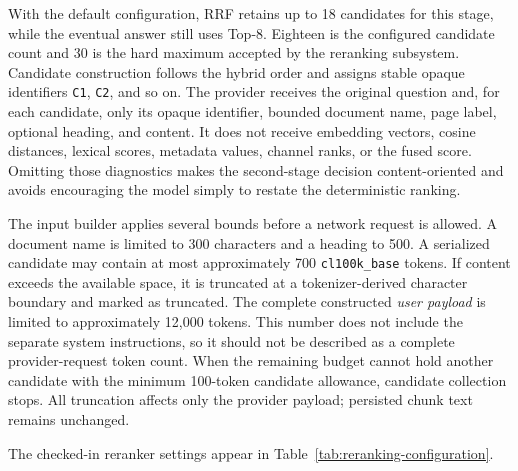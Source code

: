 With the default configuration, RRF retains up to 18 candidates for this stage, while the eventual answer still uses Top-8. Eighteen is the configured candidate count and 30 is the hard maximum accepted by the reranking subsystem. Candidate construction follows the hybrid order and assigns stable opaque identifiers \texttt{C1}, \texttt{C2}, and so on. The provider receives the original question and, for each candidate, only its opaque identifier, bounded document name, page label, optional heading, and content. It does not receive embedding vectors, cosine distances, lexical scores, metadata values, channel ranks, or the fused score. Omitting those diagnostics makes the second-stage decision content-oriented and avoids encouraging the model simply to restate the deterministic ranking.

The input builder applies several bounds before a network request is allowed. A document name is limited to 300 characters and a heading to 500. A serialized candidate may contain at most approximately 700 \texttt{cl100k\_base} tokens. If content exceeds the available space, it is truncated at a tokenizer-derived character boundary and marked as truncated. The complete constructed \emph{user payload} is limited to approximately 12,000 tokens. This number does not include the separate system instructions, so it should not be described as a complete provider-request token count. When the remaining budget cannot hold another candidate with the minimum 100-token candidate allowance, candidate collection stops. All truncation affects only the provider payload; persisted chunk text remains unchanged.

The checked-in reranker settings appear in Table~\ref{tab:reranking-configuration}.

